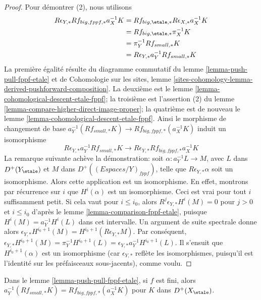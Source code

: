 \begin{proof}
\medskip\noindent
Pour démontrer (2), nous utilisons
\begin{align*}
R\epsilon_{Y, *}Rf_{big, fppf, *}a_X^{-1}K
& =
Rf_{big, \etale, *}R\epsilon_{X, *}a_X^{-1}K \\
& =
Rf_{big, \etale, *}\pi_X^{-1}K \\
& =
\pi_Y^{-1}Rf_{small, *}K \\
& =
R\epsilon_{Y, *} a_Y^{-1}Rf_{small, *}K
\end{align*}
La première égalité résulte du diagramme commutatif du lemme
\ref{lemma-push-pull-fppf-etale} et de Cohomologie sur les sites, lemme
\ref{sites-cohomology-lemma-derived-pushforward-composition}.
La deuxième est le lemme \ref{lemma-cohomological-descent-etale-fppf}; la
troisième est l'assertion (2) du lemme
\ref{lemma-compare-higher-direct-image-proper}; la quatrième est de nouveau
le lemme \ref{lemma-cohomological-descent-etale-fppf}.
Ainsi le morphisme de changement de base
$a_Y^{-1}(Rf_{small, *}K) \to Rf_{big, fppf, *}(a_X^{-1}K)$
induit un isomorphisme
$$
R\epsilon_{Y, *}a_Y^{-1}Rf_{small, *}K \to
R\epsilon_{Y, *}Rf_{big, fppf, *}a_X^{-1}K
$$
La remarque suivante achève la démonstration: soit
$\alpha : a_Y^{-1}L \to M$, avec $L$ dans $D^+(Y_\etale)$ et $M$ dans
$D^+((\textit{Espaces}/Y)_{fppf})$, telle que $R\epsilon_{Y, *}\alpha$ soit un
isomorphisme. Alors cette application est un isomorphisme. En effet, montrons par
récurrence sur $i$ que $H^i(\alpha)$ est un isomorphisme. Ceci est vrai pour
tout $i$ suffisamment petit. Si cela vaut pour $i \leq i_0$, alors
$R^j\epsilon_{Y, *}H^i(M) = 0$ pour $j > 0$ et $i \leq i_0$ d'après le lemme
\ref{lemma-comparison-fppf-etale}, puisque
$H^i(M) = a_Y^{-1}H^i(L)$ dans cet intervalle. Un argument de suite spectrale
donne alors
$\epsilon_{Y, *}H^{i_0 + 1}(M) = H^{i_0 + 1}(R\epsilon_{Y, *}M)$.
Par conséquent, $\epsilon_{Y, *}H^{i_0 + 1}(M) =
\pi_Y^{-1}H^{i_0 + 1}(L) =
\epsilon_{Y, *}a_Y^{-1}H^{i_0 + 1}(L)$. Il s'ensuit que
$H^{i_0 + 1}(\alpha)$ est un isomorphisme (car $\epsilon_{Y, *}$ reflète les
isomorphismes, puisqu'il est l'identité sur les préfaisceaux sous-jacents),
comme voulu.
\end{proof}

\begin{lemma}
\label{lemma-finite-push-pull-fppf-etale}
Dans le lemme \ref{lemma-push-pull-fppf-etale}, si $f$ est fini, alors
$a_Y^{-1}(Rf_{small, *}K) = Rf_{big, fppf, *}(a_X^{-1}K)$
pour $K$ dans $D^+(X_\etale)$.
\end{lemma}

